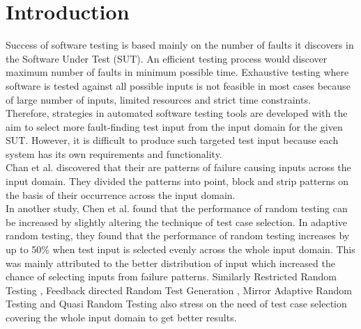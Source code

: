 \documentclass[conference]{IEEEtran}
\begin{document}
\section{Introduction}
Success of software testing is based mainly on the number of faults it discovers in the Software Under Test (SUT). An efficient testing process would discover maximum number of faults in minimum possible time. Exhaustive testing where software is tested against all possible inputs is not feasible in most cases because of large number of inputs, limited resources and strict time constraints. Therefore, strategies in automated software testing tools are developed with the aim to select more fault-finding test input from the input domain for the given SUT. However, it is difficult to produce such targeted test input because each system has its own requirements and functionality.\\
\indent Chan et al. \cite{Chan1996} discovered that their are patterns of failure causing inputs across the input domain. They divided the patterns into point, block and strip patterns on the basis of their occurrence across the input domain.\\
\indent In another study, Chen et al. \cite{Chen2008} found that the performance of random testing can be increased by slightly altering the technique of test case selection. In adaptive random testing, they found that the performance of random testing increases by up to 50\% when test input is selected evenly across the whole input domain. This was mainly attributed to the better distribution of input which increased the chance of selecting inputs from failure patterns. Similarly Restricted Random Testing \cite{Chan2002}, Feedback directed Random Test Generation \cite{Pacheco2007a}, Mirror Adaptive Random Testing \cite{Chen2003} and Quasi Random Testing \cite{Chen2005} also stress on the need of test case selection covering the whole input domain to get better results. \\
\end{document}
